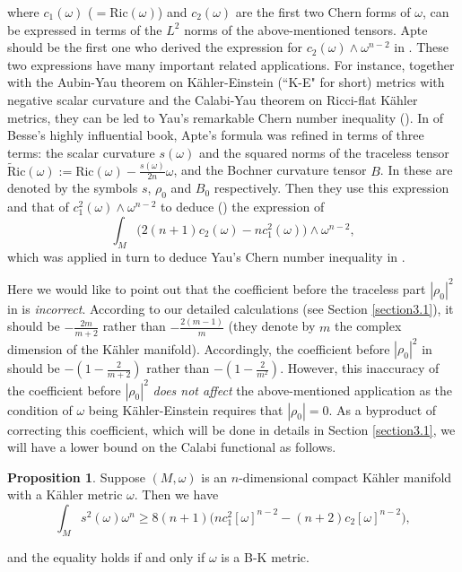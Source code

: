 \documentclass[11pt]{amsart}
\theoremstyle{definition}
\newtheorem{proposition}[theorem]{Proposition}
\theoremstyle{remark}
\numberwithin{equation}{section}
\begin{document}
where $c_1(\omega)$ \big($=\text{Ric}(\omega)$\big) and
$c_2(\omega)$ are the first two Chern forms of $\omega$, can be
expressed in terms of the $L^2$ norms of the above-mentioned
tensors. Apte should be the first one who derived the expression for
$c_2(\omega)\wedge\omega^{n-2}$ in \cite{Ap}. These two expressions
have many important related applications. For instance, together
with the Aubin-Yau theorem on K\"{a}hler-Einstein (``K-E" for short)
metrics with negative scalar curvature and the Calabi-Yau theorem on
Ricci-flat K\"{a}hler metrics, they can be led to Yau's remarkable
Chern number inequality (\cite{yau}). In \cite[p. 80, (2.80),
(2.80a)]{Be} of Besse's highly influential book, Apte's formula was
refined in terms of three terms: the scalar curvature $s(\omega)$
and the squared norms of the traceless tensor
$\tilde{\text{R}}\text{ic}(\omega):=\text{Ric}(\omega)-\frac{s(\omega)}{2n}\omega$,
and the Bochner curvature tensor $B$. In \cite[p. 80]{Be} these are
denoted by the symbols $s$, $\rho_0$ and $B_0$ respectively. Then
they use this expression and that of
$c_1^2(\omega)\wedge\omega^{n-2}$ to deduce (\cite[p. 80,
(2.82a)]{Be}) the expression of
$$\int_M\big(2(n+1)c_2(\omega)-nc_1^2(\omega)\big)\wedge\omega^{n-2},$$
which was applied in turn to deduce Yau's Chern number inequality in
\cite[p. 325]{Be}.

Here we would like to point out that the coefficient before the
traceless part $|\rho_0|^2$ in \cite[(2.80), (2.80a)]{Be} is
\emph{incorrect}. According to our detailed calculations (see
Section \ref{section3.1}), it should be $-\frac{2m}{m+2}$ rather
than $-\frac{2(m-1)}{m}$ (they denote by $m$ the complex dimension
of the K\"{a}hler manifold). Accordingly, the coefficient before
$|\rho_0|^2$ in \cite[(2.82a)]{Be} should be $-(1-\frac{2}{m+2})$
rather than $-(1-\frac{2}{m^2})$. However, this inaccuracy of the
coefficient before $|\rho_0|^2$ \emph{does not affect} the
above-mentioned application as the condition of $\omega$ being
K\"{a}hler-Einstein requires that $|\rho_0|=0$. As a byproduct of
correcting this coefficient, which will be done in details in
Section \ref{section3.1}, we will have a lower bound on the Calabi
functional as follows.

\begin{proposition}\label{proplowerbound}
Suppose $(M,\omega)$ is an $n$-dimensional compact K\"{a}hler
manifold with a K\"{a}hler metric $\omega$. Then we have
\begin{equation}\label{inequalitybochner}
\int_Ms^2(\omega)\omega^n\geq8(n+1)\big(nc_1^2[\omega]^{n-2}-(n+2)c_2[\omega]^{n-2}\big),\end{equation}

and the equality holds if and only if $\omega$ is a B-K metric.
\end{proposition}
\end{document}
